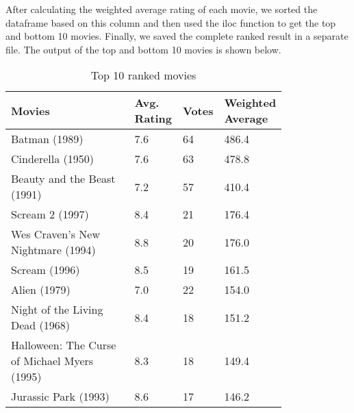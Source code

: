 \documentclass[12pt]{article}
\begin{document}
After calculating the weighted average rating of each movie, we sorted the dataframe based on this column and then used the iloc function to get the top and bottom 10 movies. Finally, we saved the complete ranked result in a separate file. The output of the top and bottom 10 movies is shown below.
\\
\begin{table}[h]
\centering
\caption{Top 10 ranked movies}
\label{tbl:simple}
\begin{tabular}{p{0.50\linewidth}p{0.10\linewidth}p{0.10\linewidth}p{0.10\linewidth}}
\hline
\textbf{Movies} & \textbf{Avg. Rating} & \textbf{Votes} & \textbf{Weighted Average} \\ \hline \hline
                                                             Batman (1989)  &       7.6   &      64   &         486.4  \\ \hline
                           Cinderella (1950)  &       7.6   &      63   &         478.8  \\ \hline
                 Beauty and the Beast (1991)  &       7.2   &      57   &         410.4  \\ \hline
                             Scream 2 (1997)  &       8.4   &      21   &         176.4  \\ \hline
           Wes Craven's New Nightmare (1994)  &       8.8   &      20   &         176.0  \\ \hline
                               Scream (1996)  &       8.5   &      19   &         161.5  \\ \hline
                                Alien (1979)  &       7.0   &      22   &         154.0  \\ \hline
             Night of the Living Dead (1968)  &       8.4   &      18   &         151.2  \\ \hline
Halloween: The Curse of Michael Myers (1995)  &       8.3   &      18   &         149.4  \\ \hline
                        Jurassic Park (1993)  &       8.6   &      17   &         146.2  \\ \hline \hline
\end{tabular}
\end{table}
\\
\end{document}
